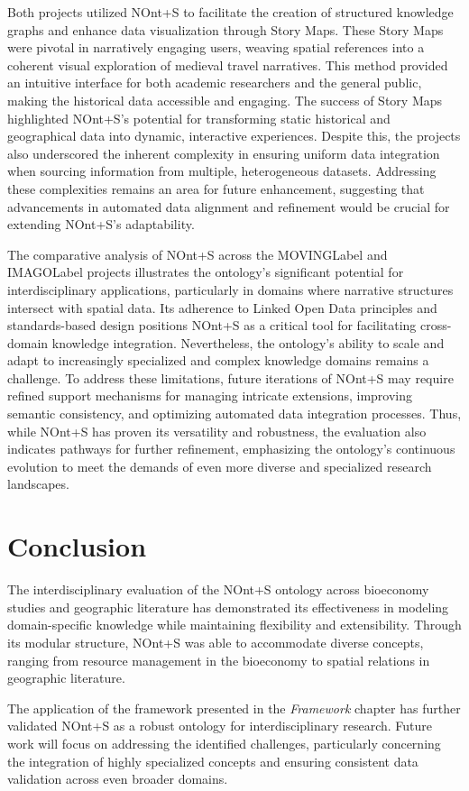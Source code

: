 Both projects utilized NOnt+S to facilitate the creation of structured knowledge graphs and enhance data visualization through Story Maps. These Story Maps were pivotal in narratively engaging users, weaving spatial references into a coherent visual exploration of medieval travel narratives. This method provided an intuitive interface for both academic researchers and the general public, making the historical data accessible and engaging. The success of Story Maps highlighted NOnt+S’s potential for transforming static historical and geographical data into dynamic, interactive experiences. Despite this, the projects also underscored the inherent complexity in ensuring uniform data integration when sourcing information from multiple, heterogeneous datasets. Addressing these complexities remains an area for future enhancement, suggesting that advancements in automated data alignment and refinement would be crucial for extending NOnt+S’s adaptability.

The comparative analysis of NOnt+S across the \acrshort{MOVINGLabel} and \acrshort{IMAGOLabel} projects illustrates the ontology’s significant potential for interdisciplinary applications, particularly in domains where narrative structures intersect with spatial data. Its adherence to Linked Open Data principles and standards-based design positions NOnt+S as a critical tool for facilitating cross-domain knowledge integration. Nevertheless, the ontology’s ability to scale and adapt to increasingly specialized and complex knowledge domains remains a challenge. To address these limitations, future iterations of NOnt+S may require refined support mechanisms for managing intricate extensions, improving semantic consistency, and optimizing automated data integration processes. Thus, while NOnt+S has proven its versatility and robustness, the evaluation also indicates pathways for further refinement, emphasizing the ontology’s continuous evolution to meet the demands of even more diverse and specialized research landscapes.


\section{Conclusion}\label{VII-sec:conclusion}

The interdisciplinary evaluation of the NOnt+S ontology across bioeconomy studies and geographic literature has demonstrated its effectiveness in modeling domain-specific knowledge while maintaining flexibility and extensibility. Through its modular structure, NOnt+S was able to accommodate diverse concepts, ranging from resource management in the bioeconomy to spatial relations in geographic literature.

The application of the framework presented in the \textit{Framework} chapter has further validated NOnt+S as a robust ontology for interdisciplinary research. Future work will focus on addressing the identified challenges, particularly concerning the integration of highly specialized concepts and ensuring consistent data validation across even broader domains.


